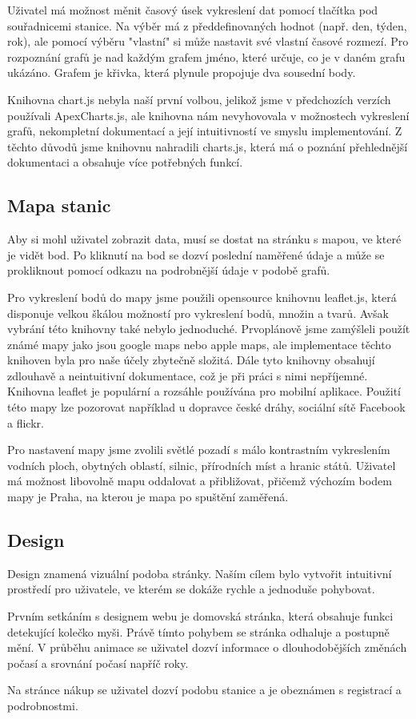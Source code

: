 Uživatel má možnost měnit časový úsek vykreslení dat pomocí tlačítka pod souřadnicemi stanice. Na výběr má z předdefinovaných hodnot (např. den, týden, rok), ale pomocí výběru "vlastní" si může nastavit své vlastní časové rozmezí.
Pro rozpoznání grafů je nad každým grafem jméno, které určuje, co je v daném grafu ukázáno. Grafem je křivka, která plynule propojuje dva sousední body.  

Knihovna chart.js nebyla naší první volbou, jelikož jsme v předchozích verzích používali ApexCharts.js, ale knihovna nám nevyhovovala v možnostech vykreslení grafů, nekompletní dokumentací a její intuitivností ve smyslu implementování.
Z těchto důvodů jsme knihovnu nahradili charts.js, která má o poznání přehlednější dokumentaci a obsahuje více potřebných funkcí.

\subsection{Mapa stanic}
Aby si mohl uživatel zobrazit data, musí se dostat na stránku s mapou, ve které je vidět bod. Po kliknutí na bod se dozví poslední naměřené údaje a může se prokliknout pomocí odkazu na podrobnější údaje v podobě grafů.

Pro vykreslení bodů do mapy jsme použili opensource knihovnu leaflet.js, která disponuje velkou škálou možností pro vykreslení bodů, množin a tvarů.
Avšak vybrání této knihovny také nebylo jednoduché. Prvoplánově jsme zamýšleli použít známé mapy jako jsou google maps nebo apple maps, ale implementace těchto knihoven byla pro naše účely zbytečně složitá. Dále tyto knihovny obsahují zdlouhavě a neintuitivní dokumentace, což je při práci s nimi nepříjemné.
Knihovna leaflet je populární a rozsáhle používána pro mobilní aplikace. Použití této mapy lze pozorovat například u dopravce české dráhy, sociální sítě Facebook a flickr.

Pro nastavení mapy jsme zvolili světlé pozadí s málo kontrastním vykreslením vodních ploch, obytných oblastí, silnic, přírodních míst a hranic států. Uživatel má možnost libovolně mapu oddalovat a přibližovat, přičemž výchozím bodem mapy je Praha, na kterou je mapa po spuštění zaměřená.

\subsection{Design}
Design znamená vizuální podoba stránky.
Naším cílem bylo vytvořit intuitivní prostředí pro uživatele, ve kterém se dokáže rychle a jednoduše pohybovat.

Prvním setkáním s designem webu je domovská stránka, která obsahuje funkci detekující kolečko myši.
Právě tímto pohybem se stránka odhaluje a postupně mění. V průběhu animace se uživatel dozví informace o dlouhodobějších změnách počasí a srovnání počasí napříč roky.

Na stránce nákup se uživatel dozví podobu stanice a je obeznámen s registrací a podrobnostmi.
